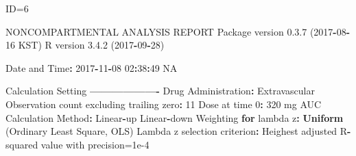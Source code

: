 \documentclass[12pt,]{krantz}
\newenvironment{Shaded}{\begin{snugshade}}{\end{snugshade}}
\newcommand{\KeywordTok}[1]{\textcolor[rgb]{0.13,0.29,0.53}{\textbf{#1}}}
\newcommand{\DecValTok}[1]{\textcolor[rgb]{0.00,0.00,0.81}{#1}}
\newcommand{\FloatTok}[1]{\textcolor[rgb]{0.00,0.00,0.81}{#1}}
\newcommand{\StringTok}[1]{\textcolor[rgb]{0.31,0.60,0.02}{#1}}
\newcommand{\OtherTok}[1]{\textcolor[rgb]{0.56,0.35,0.01}{#1}}
\newcommand{\ControlFlowTok}[1]{\textcolor[rgb]{0.13,0.29,0.53}{\textbf{#1}}}
\newcommand{\OperatorTok}[1]{\textcolor[rgb]{0.81,0.36,0.00}{\textbf{#1}}}
\newcommand{\NormalTok}[1]{#1}
\theoremstyle{definition}
\theoremstyle{definition}
\theoremstyle{definition}
\theoremstyle{remark}
\begin{document}
\begin{Shaded}
\begin{Highlighting}[]
\NormalTok{ID=}\DecValTok{6}

\NormalTok{                        NONCOMPARTMENTAL ANALYSIS REPORT}
\NormalTok{                       Package version }\FloatTok{0.3}\NormalTok{.}\DecValTok{7}\NormalTok{ (}\DecValTok{2017}\OperatorTok{-}\DecValTok{08}\OperatorTok{-}\DecValTok{16}\NormalTok{ KST)}
\NormalTok{                          R version }\FloatTok{3.4}\NormalTok{.}\DecValTok{2}\NormalTok{ (}\DecValTok{2017}\OperatorTok{-}\DecValTok{09}\OperatorTok{-}\DecValTok{28}\NormalTok{)}

\NormalTok{Date and Time}\OperatorTok{:}\StringTok{ }\DecValTok{2017}\OperatorTok{-}\DecValTok{11}\OperatorTok{-}\DecValTok{08} \DecValTok{02}\OperatorTok{:}\DecValTok{38}\OperatorTok{:}\DecValTok{49} \OtherTok{NA}

\NormalTok{Calculation Setting}
\OperatorTok{-------------------}
\NormalTok{Drug Administration}\OperatorTok{:}\StringTok{ }\NormalTok{Extravascular}
\NormalTok{Observation count excluding trailing zero}\OperatorTok{:}\StringTok{ }\DecValTok{11}
\NormalTok{Dose at time }\DecValTok{0}\OperatorTok{:}\StringTok{ }\DecValTok{320}\NormalTok{ mg}
\NormalTok{AUC Calculation Method}\OperatorTok{:}\StringTok{ }\NormalTok{Linear}\OperatorTok{-}\NormalTok{up Linear}\OperatorTok{-}\NormalTok{down}
\NormalTok{Weighting }\ControlFlowTok{for}\NormalTok{ lambda z}\OperatorTok{:}\StringTok{ }\KeywordTok{Uniform}\NormalTok{ (Ordinary Least Square, OLS)}
\NormalTok{Lambda z selection criterion}\OperatorTok{:}\StringTok{ }\NormalTok{Heighest adjusted R}\OperatorTok{-}\NormalTok{squared value with precision=}\FloatTok{1e-4}



\end{Highlighting}
\end{Shaded}
\end{document}

